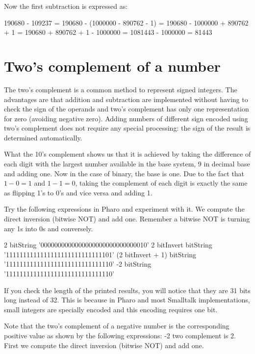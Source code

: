\documentclass[a4paper,10pt,twoside]{book}
\begin{document}
Now the first subtraction is expressed as:
\begin{code}{}
190680 - 109237
= 190680 - (1000000 - 890762 - 1)
= 190680 - 1000000 + 890762 + 1
= 190680  + 890762 + 1 - 1000000
= 1081443 - 1000000
= 81443
\end{code}


\section{Two's complement of a number}

The two's complement is a common method to represent signed integers. The advantages are that addition and subtraction are implemented without having to  check the sign of the operands and two's complement has only one representation for zero (avoiding negative zero). Adding numbers of different sign encoded using two's complement does not  require any special processing: the sign of the result is determined automatically. 

What the 10's complement shows us  that it is achieved by taking the difference of each digit with the largest number available in the base system, 9 in decimal base and adding one. Now in the case of binary, the base is one.
Due to the fact that $1 - 0 = 1$ and $1 - 1 = 0$, taking the complement of each digit is exactly the same as flipping 1's to 0's and vice versa and adding 1.


Try the following expressions in Pharo and experiment with it. We compute the direct inversion (bitwise NOT) and add one. 
Remember a bitwise NOT is turning any 1s into 0s and conversely. 

\begin{code}{}
2 bitString 
			'0000000000000000000000000000010'
2 bitInvert bitString 
			'1111111111111111111111111111101'
(2 bitInvert + 1) bitString 
			'1111111111111111111111111111110'
-2 bitString 
			'1111111111111111111111111111110'		 
\end{code}

If you check the length of the printed results, you will notice that they are 31 bits long instead of 32. This is because in Pharo and most Smalltalk implementations, small integers are specially encoded and this encoding requires one bit.

Note that the two's complement of a negative number is the corresponding positive value as shown by the following expressions: -2 two complement is 2. First we compute the direct inversion (bitwise NOT) and add one. 
\end{document}
